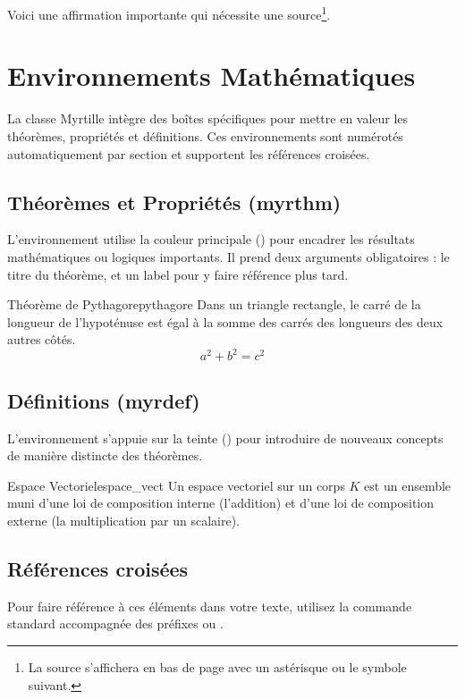 \documentclass[theme=myrtille]{myrtille}
\begin{document}
Voici une affirmation importante qui nécessite une source\footnote{La source s'affichera en bas de page avec un astérisque ou le symbole suivant.}.

\section{Environnements Mathématiques}
La classe Myrtille intègre des boîtes spécifiques pour mettre en valeur les théorèmes, propriétés et définitions. Ces environnements sont numérotés automatiquement par section et supportent les références croisées.

\subsection{Théorèmes et Propriétés (myrthm)}
L'environnement  utilise la couleur principale () pour encadrer les résultats mathématiques ou logi\-ques importants. Il prend deux arguments obligatoires : le titre du théorème, et un label pour y faire référence plus tard.

\begin{myrthm}{Théorème de Pythagore}{pythagore}
Dans un triangle rectangle, le carré de la longueur de l'hypoténuse est égal à la somme des carrés des longueurs des deux autres côtés.
\[ a^2 + b^2 = c^2 \]
\end{myrthm}

\subsection{Définitions (myrdef)}
L'environnement  s'appuie sur la teinte () pour introduire de nouveaux concepts de manière distincte des théorèmes.

\begin{myrdef}{Espace Vectoriel}{espace_vect}
Un espace vectoriel sur un corps $K$ est un ensemble muni d'une loi de composition interne (l'addition) et d'une loi de composition externe (la multiplication par un scalaire).
\end{myrdef}

\subsection{Références croisées}
Pour faire référence à ces éléments dans votre texte, utilisez la commande standard  accompagnée des préfixes  ou .
\end{document}
